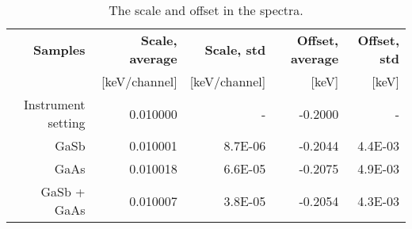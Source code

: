 \begin{table}[htbp]
    \begin{center}
        \caption{
            The scale and offset in the spectra.
        }
        \label{tab:results:scale_offset}
        \begin{tabular}{rrrrr}
            \hline
            \textbf{Samples}   & \textbf{Scale, average} & \textbf{Scale, std} & \textbf{Offset, average} & \textbf{Offset, std} \\
                               & [keV/channel]           & [keV/channel]       & [keV]                    & [keV]                \\
            \hline
            Instrument setting & 0.010000                & -                   & -0.2000                  & -                    \\

            GaSb               & 0.010001                & 8.7E-06             & -0.2044                  & 4.4E-03              \\
            GaAs               & 0.010018                & 6.6E-05             & -0.2075                  & 4.9E-03              \\
            GaSb + GaAs        & 0.010007                & 3.8E-05             & -0.2054                  & 4.3E-03              \\
            \hline
        \end{tabular}
    \end{center}
\end{table}
